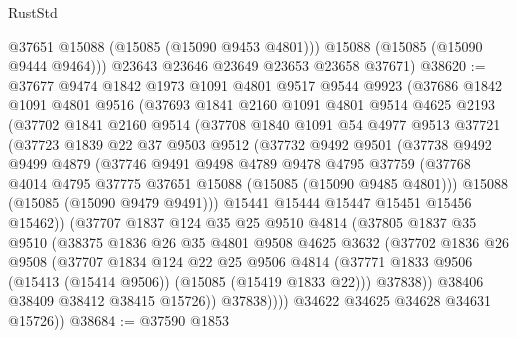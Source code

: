 \begin{lexlean}{RustStd}
\begin{coremodule}
          @37651
          @15088
          (@15085 (@15090 @9453 @4801)))
        @15088
        (@15085 (@15090 @9444 @9464)))
      @23643
      @23646
      @23649
      @23653
      @23658
      @37671)
@38620 := @37677
    @9474
    @1842
    @1973
    @1091
    @4801
    @9517
    @9544
    @9923
    (@37686
      @1842
      @1091
      @4801
      @9516
      (@37693
        @1841
        @2160
        @1091
        @4801
        @9514
        @4625
        @2193
        (@37702
          @1841
          @2160
          @9514
          (@37708
            @1840
            @1091
            @54
            @4977
            @9513
            @37721
            (@37723
              @1839
              @22
              @37
              @9503
              @9512
              (@37732
                @9492
                @9501
                (@37738
                  @9492
                  @9499
                  @4879
                  (@37746
                    @9491
                    @9498
                    @4789
                    @9478
                    @4795
                    @37759
                    (@37768 @4014 @4795 @37775 @37651 @15088 (@15085 (@15090 @9485 @4801)))
                    @15088
                    (@15085 (@15090 @9479 @9491)))
                  @15441
                  @15444
                  @15447
                  @15451
                  @15456
                  @15462))
              (@37707
                @1837
                @124
                @35
                @25
                @9510
                @4814
                (@37805
                  @1837
                  @35
                  @9510
                  (@38375
                    @1836
                    @26
                    @35
                    @4801
                    @9508
                    @4625
                    @3632
                    (@37702
                      @1836
                      @26
                      @9508
                      (@37707
                        @1834
                        @124
                        @22
                        @25
                        @9506
                        @4814
                        (@37771 @1833 @9506 (@15413 (@15414 @9506)) (@15085 (@15419 @1833 @22)))
                        @37838))
                    @38406
                    @38409
                    @38412
                    @38415
                    @15726))
                @37838))))
        @34622
        @34625
        @34628
        @34631
        @15726))
@38684 := @37590
    @1853

\end{coremodule}
\end{lexlean}
